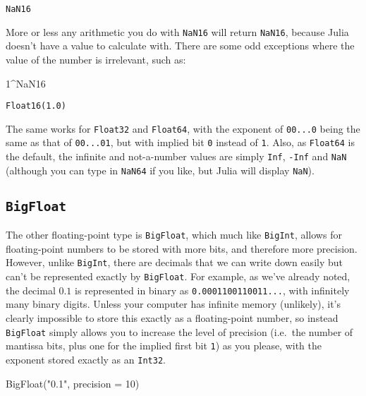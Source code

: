 \documentclass[
  letterpaper,
  DIV=11,
  numbers=noendperiod]{scrreprt}
\newenvironment{Shaded}{\begin{snugshade}}{\end{snugshade}}
\newcommand{\ConstantTok}[1]{\textcolor[rgb]{0.56,0.35,0.01}{#1}}
\newcommand{\FloatTok}[1]{\textcolor[rgb]{0.68,0.00,0.00}{#1}}
\newcommand{\FunctionTok}[1]{\textcolor[rgb]{0.28,0.35,0.67}{#1}}
\newcommand{\NormalTok}[1]{\textcolor[rgb]{0.00,0.23,0.31}{#1}}
\newcommand{\OperatorTok}[1]{\textcolor[rgb]{0.37,0.37,0.37}{#1}}
\newcommand{\StringTok}[1]{\textcolor[rgb]{0.13,0.47,0.30}{#1}}
\begin{document}
\begin{verbatim}
NaN16
\end{verbatim}

More or less any arithmetic you do with \texttt{NaN16} will return
\texttt{NaN16}, because Julia doesn't have a value to calculate with.
There are some odd exceptions where the value of the number is
irrelevant, such as:

\begin{Shaded}
\begin{Highlighting}[]
\FloatTok{1}\OperatorTok{\^{}}\ConstantTok{NaN16}
\end{Highlighting}
\end{Shaded}

\begin{verbatim}
Float16(1.0)
\end{verbatim}

The same works for \texttt{Float32} and \texttt{Float64}, with the
exponent of \texttt{00...0} being the same as that of \texttt{00...01},
but with implied bit \texttt{0} instead of \texttt{1}. Also, as
\texttt{Float64} is the default, the infinite and not-a-number values
are simply \texttt{Inf}, \texttt{-Inf} and \texttt{NaN} (although you
can type in \texttt{NaN64} if you like, but Julia will display
\texttt{NaN}).

\hypertarget{bigfloat}{%
\subsection{\texorpdfstring{\texttt{BigFloat}}{BigFloat}}\label{bigfloat}}

The other floating-point type is \texttt{BigFloat}, which much like
\texttt{BigInt}, allows for floating-point numbers to be stored with
more bits, and therefore more precision. However, unlike
\texttt{BigInt}, there are decimals that we can write down easily but
can't be represented exactly by \texttt{BigFloat}. For example, as we've
already noted, the decimal \(0.1\) is represented in binary as
\texttt{0.0001100110011...}, with infinitely many binary digits. Unless
your computer has infinite memory (unlikely), it's clearly impossible to
store this exactly as a floating-point number, so instead
\texttt{BigFloat} simply allows you to increase the level of precision
(i.e.~the number of mantissa bits, plus one for the implied first bit
\texttt{1}) as you please, with the exponent stored exactly as an
\texttt{Int32}.

\begin{Shaded}
\begin{Highlighting}[]
\FunctionTok{BigFloat}\NormalTok{(}\StringTok{"0.1"}\NormalTok{, precision }\OperatorTok{=} \FloatTok{10}\NormalTok{)}
\end{Highlighting}
\end{Shaded}
\end{document}
